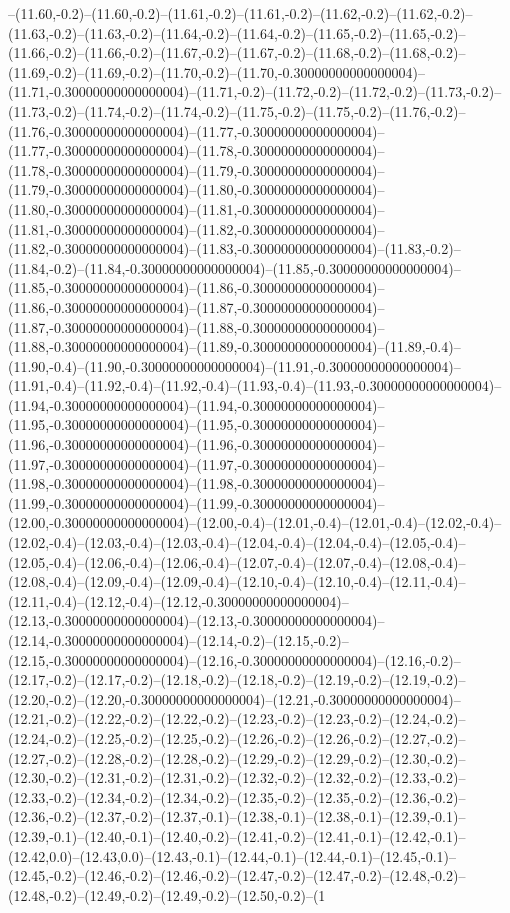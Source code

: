 --(11.60,-0.2)--(11.60,-0.2)--(11.61,-0.2)--(11.61,-0.2)--(11.62,-0.2)--(11.62,-0.2)--(11.63,-0.2)--(11.63,-0.2)--(11.64,-0.2)--(11.64,-0.2)--(11.65,-0.2)--(11.65,-0.2)--(11.66,-0.2)--(11.66,-0.2)--(11.67,-0.2)--(11.67,-0.2)--(11.68,-0.2)--(11.68,-0.2)--(11.69,-0.2)--(11.69,-0.2)--(11.70,-0.2)--(11.70,-0.30000000000000004)--(11.71,-0.30000000000000004)--(11.71,-0.2)--(11.72,-0.2)--(11.72,-0.2)--(11.73,-0.2)--(11.73,-0.2)--(11.74,-0.2)--(11.74,-0.2)--(11.75,-0.2)--(11.75,-0.2)--(11.76,-0.2)--(11.76,-0.30000000000000004)--(11.77,-0.30000000000000004)--(11.77,-0.30000000000000004)--(11.78,-0.30000000000000004)--(11.78,-0.30000000000000004)--(11.79,-0.30000000000000004)--(11.79,-0.30000000000000004)--(11.80,-0.30000000000000004)--(11.80,-0.30000000000000004)--(11.81,-0.30000000000000004)--(11.81,-0.30000000000000004)--(11.82,-0.30000000000000004)--(11.82,-0.30000000000000004)--(11.83,-0.30000000000000004)--(11.83,-0.2)--(11.84,-0.2)--(11.84,-0.30000000000000004)--(11.85,-0.30000000000000004)--(11.85,-0.30000000000000004)--(11.86,-0.30000000000000004)--(11.86,-0.30000000000000004)--(11.87,-0.30000000000000004)--(11.87,-0.30000000000000004)--(11.88,-0.30000000000000004)--(11.88,-0.30000000000000004)--(11.89,-0.30000000000000004)--(11.89,-0.4)--(11.90,-0.4)--(11.90,-0.30000000000000004)--(11.91,-0.30000000000000004)--(11.91,-0.4)--(11.92,-0.4)--(11.92,-0.4)--(11.93,-0.4)--(11.93,-0.30000000000000004)--(11.94,-0.30000000000000004)--(11.94,-0.30000000000000004)--(11.95,-0.30000000000000004)--(11.95,-0.30000000000000004)--(11.96,-0.30000000000000004)--(11.96,-0.30000000000000004)--(11.97,-0.30000000000000004)--(11.97,-0.30000000000000004)--(11.98,-0.30000000000000004)--(11.98,-0.30000000000000004)--(11.99,-0.30000000000000004)--(11.99,-0.30000000000000004)--(12.00,-0.30000000000000004)--(12.00,-0.4)--(12.01,-0.4)--(12.01,-0.4)--(12.02,-0.4)--(12.02,-0.4)--(12.03,-0.4)--(12.03,-0.4)--(12.04,-0.4)--(12.04,-0.4)--(12.05,-0.4)--(12.05,-0.4)--(12.06,-0.4)--(12.06,-0.4)--(12.07,-0.4)--(12.07,-0.4)--(12.08,-0.4)--(12.08,-0.4)--(12.09,-0.4)--(12.09,-0.4)--(12.10,-0.4)--(12.10,-0.4)--(12.11,-0.4)--(12.11,-0.4)--(12.12,-0.4)--(12.12,-0.30000000000000004)--(12.13,-0.30000000000000004)--(12.13,-0.30000000000000004)--(12.14,-0.30000000000000004)--(12.14,-0.2)--(12.15,-0.2)--(12.15,-0.30000000000000004)--(12.16,-0.30000000000000004)--(12.16,-0.2)--(12.17,-0.2)--(12.17,-0.2)--(12.18,-0.2)--(12.18,-0.2)--(12.19,-0.2)--(12.19,-0.2)--(12.20,-0.2)--(12.20,-0.30000000000000004)--(12.21,-0.30000000000000004)--(12.21,-0.2)--(12.22,-0.2)--(12.22,-0.2)--(12.23,-0.2)--(12.23,-0.2)--(12.24,-0.2)--(12.24,-0.2)--(12.25,-0.2)--(12.25,-0.2)--(12.26,-0.2)--(12.26,-0.2)--(12.27,-0.2)--(12.27,-0.2)--(12.28,-0.2)--(12.28,-0.2)--(12.29,-0.2)--(12.29,-0.2)--(12.30,-0.2)--(12.30,-0.2)--(12.31,-0.2)--(12.31,-0.2)--(12.32,-0.2)--(12.32,-0.2)--(12.33,-0.2)--(12.33,-0.2)--(12.34,-0.2)--(12.34,-0.2)--(12.35,-0.2)--(12.35,-0.2)--(12.36,-0.2)--(12.36,-0.2)--(12.37,-0.2)--(12.37,-0.1)--(12.38,-0.1)--(12.38,-0.1)--(12.39,-0.1)--(12.39,-0.1)--(12.40,-0.1)--(12.40,-0.2)--(12.41,-0.2)--(12.41,-0.1)--(12.42,-0.1)--(12.42,0.0)--(12.43,0.0)--(12.43,-0.1)--(12.44,-0.1)--(12.44,-0.1)--(12.45,-0.1)--(12.45,-0.2)--(12.46,-0.2)--(12.46,-0.2)--(12.47,-0.2)--(12.47,-0.2)--(12.48,-0.2)--(12.48,-0.2)--(12.49,-0.2)--(12.49,-0.2)--(12.50,-0.2)--(1